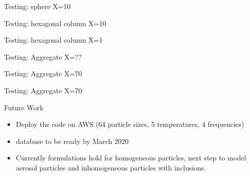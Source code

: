 \documentclass[12pt]{beamer}
\begin{document}
\begin{frame}{Testing: sphere X=10}
    
\end{frame}

\begin{frame}{Testing: hexagonal column X=10}
    
\end{frame}

\begin{frame}{Testing: hexagonal column X=1}
    
\end{frame}

\begin{frame}{Testing: Aggregate X=??}
    
\end{frame}

\begin{frame}{Testing: Aggregate X=70}
     
\end{frame}

\begin{frame}{Testing: Aggregate X=70}
     
\end{frame}

\begin{frame}{Future Work}
    \begin{itemize}
        \item Deploy the code on AWS (64 particle sizes, 5 temperatures, 4 frequencies)
        \item database to be ready by March 2020
        \item Currently formulations hold for homogeneous particles, next step to model aerosol particles and inhomogeneous particles with inclusions.
    \end{itemize}
\end{frame}
\end{document}
